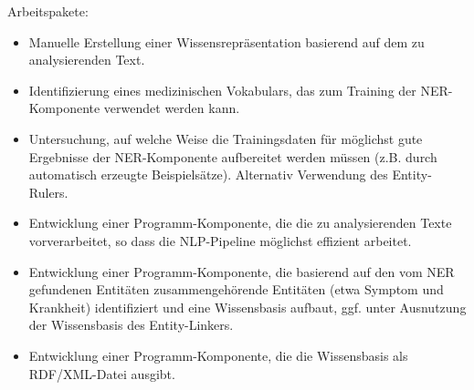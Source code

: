 Arbeitspakete:
\begin{itemize}
    \item Manuelle Erstellung einer Wissensrepräsentation basierend auf dem zu analysierenden Text.
    \item Identifizierung eines medizinischen Vokabulars, das zum Training der NER-Komponente verwendet werden kann.
    \item Untersuchung, auf welche Weise die Trainingsdaten für möglichst gute Ergebnisse der NER-Komponente aufbereitet werden müssen (z.B. durch automatisch erzeugte Beispielsätze). Alternativ Verwendung des Entity-Rulers.
    \item Entwicklung einer Programm-Komponente, die die zu analysierenden Texte vorverarbeitet, so dass die NLP-Pipeline möglichst effizient arbeitet.
    \item Entwicklung einer Programm-Komponente, die basierend auf den vom NER gefundenen Entitäten zusammengehörende Entitäten (etwa Symptom und Krankheit) identifiziert und eine Wissensbasis aufbaut, ggf. unter Ausnutzung der Wissensbasis des Entity-Linkers.
    \item Entwicklung einer Programm-Komponente, die die Wissensbasis als RDF/XML-Datei ausgibt.
\end{itemize}



